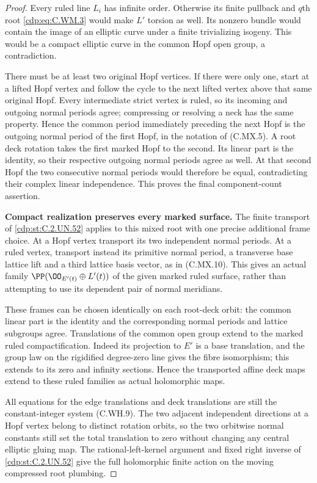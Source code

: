 \begin{proof}
Every ruled line $L_i$ has infinite
order. Otherwise its finite pullback
and $q$th root \eqref{cdp:eq:C.WM.3} would make
$L'$ torsion as well. Its nonzero
bundle would contain the image of
an elliptic curve under a finite
trivializing isogeny. This would be
a compact elliptic curve in the
common Hopf open group, a contradiction.

There must be at least two original
Hopf vertices. If there were only one,
start at a lifted Hopf vertex and
follow the cycle to the next lifted
vertex above that same original Hopf.
Every intermediate strict vertex is
ruled, so its incoming and outgoing
normal periods agree; compressing
or resolving a neck has the same
property. Hence the common period
immediately preceding the next Hopf
is the outgoing normal period of
the first Hopf, in the notation of
(C.MX.5). A root deck rotation takes
the first marked Hopf to the second.
Its linear part is the identity,
so their respective outgoing normal
periods agree as well. At that
second Hopf the two consecutive
normal periods would therefore be
equal, contradicting their complex
linear independence. This proves
the final component-count assertion.

\par\medskip\noindent\textbf{Compact realization preserves every marked surface.}
The finite transport of \ref{cdp:st:C.2.UN.52} applies
to this mixed root with one precise
additional frame choice. At a Hopf
vertex transport its two independent
normal periods. At a ruled vertex,
transport instead its primitive
normal period, a transverse base
lattice lift and a third lattice
basis vector, as in (C.MX.10).
This gives an actual family
$\PP(\OO_{E'(t)}\oplus L'(t))$
of the given marked ruled surface,
rather than attempting to use its
dependent pair of normal meridians.

These frames can be chosen identically
on each root-deck orbit: the common
linear part is the identity and
the corresponding normal periods
and lattice subgroups agree.
Translations of the common open
group extend to the marked ruled
compactification. Indeed its
projection to $E'$ is a base
translation, and the group law on
the rigidified degree-zero line
gives the fibre isomorphism;
this extends to its zero and
infinity sections. Hence the
transported affine deck maps
extend to these ruled families
as actual holomorphic maps.

All equations for the edge
translations and deck translations
are still the constant-integer
system (C.WH.9).
The two adjacent independent
directions at a Hopf vertex belong
to distinct rotation orbits, so
the two orbitwise normal constants
still set the total translation
to zero without changing any
central elliptic gluing map.
The rational-left-kernel argument
and fixed right inverse of \ref{cdp:st:C.2.UN.52}
give the full holomorphic finite
action on the moving compressed
root plumbing.


\end{proof}
